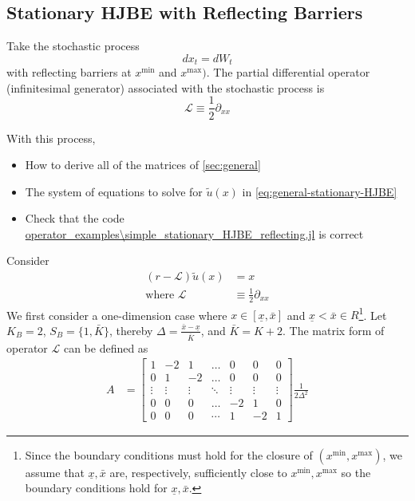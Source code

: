\documentclass[11pt]{article}
\newcommand{\D}[1][]{\ensuremath{\partial_{#1}}}
\begin{document}
\subsection{Stationary HJBE with Reflecting Barriers}
Take the stochastic process
$$
d x_t = d W_t
$$
with reflecting barriers at $x^{\min}$ and $x^{\max})$.  The partial differential operator (infinitesimal generator) associated with the stochastic process is
$$
	\mathcal{L} \equiv \frac{1}{2}\D[xx]
$$

With this process,
\begin{itemize}
	\item How to derive all of the matrices of \cref{sec:general}
	\item The system of equations to solve for $\tilde{u}(x)$ in \cref{eq:general-stationary-HJBE}
	\item Check that the code \url{operator_examples\simple_stationary_HJBE_reflecting.jl} is correct
\end{itemize}
Consider
\begin{align}
(r - \mathcal{L} )\tilde{u}(x) &= x\label{HJBE_reflecting_barriers_PDE}\\
\text{where }\mathcal{L}&\equiv \frac{1}{2}\partial_{xx}
\end{align}
We first consider a one-dimension case where $x\in [\underline{\textit{\~{x}}}, \bar{\textit{\~{x}}}]$ and $\underline{\textit{\~{x}}} < \bar{\textit{\~{x}}} \in R$\footnote{Since the boundary conditions must hold for the closure of $(x^{\min},x^{\max})$, we assume that $\underline{\textit{\~{x}}}, \bar{\textit{\~{x}}}$ are, respectively, sufficiently close to $x^{\min}, x^{\max}$ so the boundary conditions hold for $\underline{\textit{\~{x}}}, \bar{\textit{\~{x}}}$.}. Let $K_B = 2$, $S_B = \{1,\bar{K}\}$, thereby $\Delta  = \frac{\bar{\textit{\~{x}}}-\underline{\textit{\~{x}}}}{\bar{K}}$, and $\bar{K} = K+2$. The matrix form of operator $\mathcal{L}$ can be defined as
\begin{align}
A &= \begin{bmatrix}
1&-2&1&\dots&0&0&0\\
0&1&-2&\dots&0&0&0\\
\vdots&\vdots&\vdots&\ddots&\vdots&\vdots&\vdots\\
0&0&0&\dots&-2&1&0\\
0&0&0&\cdots&1&-2&1
\end{bmatrix}\frac{1}{2\Delta^{2}}
\end{align}
\end{document}
